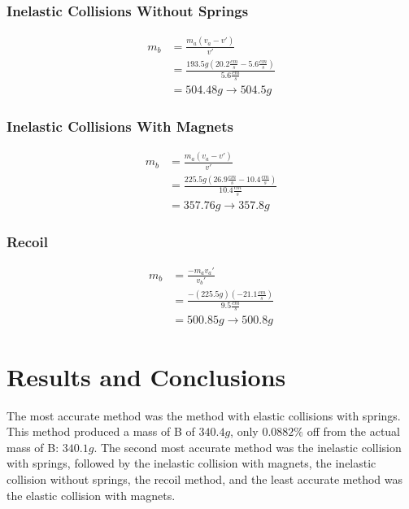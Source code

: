 \documentclass[12pt]{article}
\begin{document}
\subsubsection{Inelastic Collisions Without Springs}
\begin{equation}
	\begin{aligned}
		m_b & =\frac{m_a(v_a-v')}{v'}                                           \\
		    & =\frac{193.5g(20.2\frac{cm}{s}-5.6\frac{cm}{s})}{5.6\frac{cm}{s}} \\
		    & =504.48g\rightarrow504.5g                                         
	\end{aligned}
\end{equation}
\subsubsection{Inelastic Collisions With Magnets}
\begin{equation}
	\begin{aligned}
		m_b & =\frac{m_a(v_a-v')}{v'}                                             \\
		    & =\frac{225.5g(26.9\frac{cm}{s}-10.4\frac{cm}{s})}{10.4\frac{cm}{s}} \\
		    & =357.76g\rightarrow357.8g                                           
	\end{aligned}
\end{equation}
\subsubsection{Recoil}
\begin{equation}
	\begin{aligned}
		m_b & =\frac{-m_av_a'}{v_b'}                                \\
		    & =\frac{-(225.5g)(-21.1\frac{cm}{s})}{9.5\frac{cm}{s}} \\
		    & =500.85g\rightarrow500.8g                             
	\end{aligned}
\end{equation}

\newpage
\section{Results and Conclusions}
The most accurate method was the method with elastic collisions with springs. This method produced a mass of B of $340.4g$, only $0.0882\%$ off from the actual mass of B: $340.1g$. The second most accurate method was the inelastic collision with springs, followed by the inelastic collision with magnets, the inelastic collision without springs, the recoil method, and the least accurate method was the elastic collision with magnets.
\end{document}
